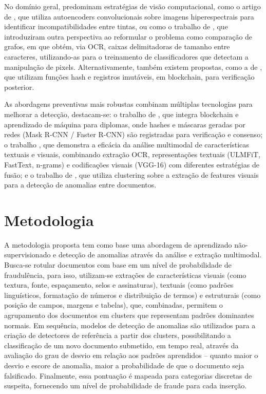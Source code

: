 \documentclass[12pt]{article}
\begin{document}
No domínio geral, predominam estratégias de visão computacional, como o artigo de \cite{inkcnn}, que utiliza autoencoders convolucionais sobre imagens hiperespectrais para identificar incompatibilidades entre tintas, ou como o trabalho de \cite{ocrgraph}, que introduziram outra perspectiva ao reformular o problema como comparação de grafos, em que obtém, via OCR, caixas delimitadoras de tamanho entre caracteres, utilizando-as para o treinamento de classificadores que detectam a manipulação de pixels. Alternativamente, também existem propostas, como a de \cite{hashdetection}, que utilizam funções hash e registros imutáveis, em blockchain, para verificação posterior.

As abordagens preventivas mais robustas combinam múltiplas tecnologias para melhorar a detecção, destacam-se: o trabalho de \cite{blockchainforgery}, que integra blockchain e aprendizado de máquina para diplomas, onde hashes e máscaras geradas por redes (Mask R-CNN / Faster R-CNN) são registradas para verificação e consenso; o trabalho \cite{multimodal}, que demonstra a eficácia da análise multimodal de características textuais e visuais, combinando extração OCR, representações textuais (ULMFiT, FastText, n-grams) e codificações visuais (VGG-16) com diferentes estratégias de fusão; e o trabalho de \cite{clusterfraudverification}, que utiliza clustering sobre a extração de features visuais para a detecção de anomalias entre documentos.

\section{Metodologia}

A metodologia proposta tem como base uma abordagem de aprendizado não-supervisionado e detecção de anomalias através da análise e extração multimodal. Busca-se rotular documentos com base em um nível de probabilidade de fraudulência, para isso, utilizam-se extrações de características visuais (como textura, fonte, espaçamento, selos e assinaturas), textuais (como padrões linguísticos, formatação de números e distribuição de termos) e estruturais (como posição de campos, margens e tabelas), que, combinadas, permitem o agrupamento dos documentos em clusters que representam padrões dominantes normais. Em sequência, modelos de detecção de anomalias são utilizados para a criação de detectores de referência a partir dos clusters, possibilitando a classificação de um novo documento submetido, em tempo real, através da avaliação do grau de desvio em relação aos padrões aprendidos -- quanto maior o desvio e escore de anomalia, maior a probabilidade de que o documento seja falsificado. Finalmente, essa pontuação é mapeada para categorias discretas de suspeita, fornecendo um nível de probabilidade de fraude para cada inserção.
\end{document}

